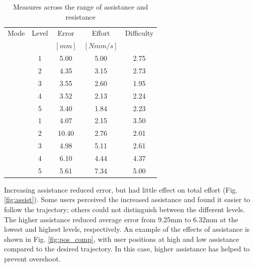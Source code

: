 \documentclass[12pt]{report}
\begin{document}
	\begin{table}[ht] \label{tab:expA}
	\centering
	\caption{Measures across the range of assistance and resistance}
	\begin{tabular}{c c c c c}
	\toprule
	Mode & Level & Error & Effort & Difficulty \\
	& & \tiny $[mm]$ & \tiny $[N mm/s]$  & \\
	\midrule
	\cellcolor{white} 						& 1 & 5.00 & 5.00   & 2.75 \\ 
	\rowcolor{gray!10}		
	\cellcolor{white}						& 2 & 4.35 & 3.15  & 2.73 \\ 
	\cellcolor{white}						& 3 & 3.55 & 2.60  & 1.95 \\ 
	\rowcolor{gray!10}
	\cellcolor{white}						& 4 & 3.52 & 2.13  & 2.24 \\ 
	\cellcolor{white}	\multirow{-5}{*}{Assist} 	& 5 & 3.40  & 1.84  & 2.23 \\ 
	\midrule
	\rowcolor{gray!10}
	\cellcolor{white} 						& 1 & 4.07 & 2.15  & 3.50 \\ 
	\cellcolor{white}
	\cellcolor{white}						& 2 & 10.40 & 2.76  & 2.01 \\
	\rowcolor{gray!10}
	\cellcolor{white}						& 3 & 4.98 & 5.11  & 2.61 \\ 
	\cellcolor{white}						& 4 & 6.10 & 4.44  & 4.37 \\ 
	\rowcolor{gray!10}
	\cellcolor{white}	\multirow{-5}{*}{Resist}		& 5 & 5.61 & 7.34  & 5.00 \\ 
	\bottomrule
	\end{tabular}
	\end{table}
	
	Increasing assistance reduced error, but had little effect on total effort (Fig. \ref{fig:assist}). Some users perceived the increased assistance and found it easier to follow the trajectory; others could not distinguish between the different levels. The higher assistance reduced average error from 9.25mm to 6.32mm at the lowest and highest levels, respectively. An example of the effects of assistance is shown in Fig. \ref{fig:pos_comp}, with user positions at high and low assistance compared to the desired trajectory. In this case, higher assistance has helped to prevent overshoot.
	
\end{document}

